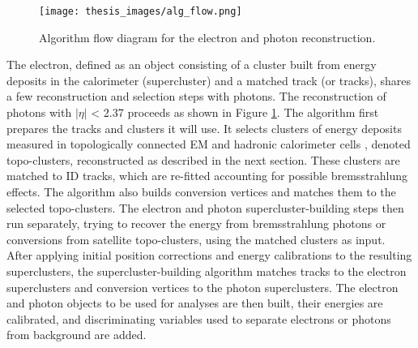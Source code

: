 \documentclass[a4paper, oneside, 11pt, openright]{book}
\begin{document}
		\begin{figure}
			\centering
			\texttt{[image: thesis\_images/alg\_flow.png]} 
			\caption{Algorithm flow diagram for the electron and photon reconstruction.}
			\label{fig:alg ph}
		\end{figure}
		
		The electron, defined as an object consisting of a cluster built from energy deposits in the calorimeter (supercluster) and a matched track (or tracks), shares a few reconstruction and selection steps with photons. The reconstruction of photons with $|\eta|$ < 2.37 proceeds as shown in Figure \ref{fig:alg ph}. The algorithm first prepares the tracks and clusters it will use. It selects clusters of energy deposits measured in topologically connected EM and hadronic calorimeter cells \cite{topo_cluster}, denoted topo-clusters, reconstructed as described in the next section. These clusters are matched to ID tracks, which are re-fitted accounting for possible bremsstrahlung effects. The algorithm also builds conversion vertices and matches them to the selected topo-clusters. The electron and photon supercluster-building steps then run separately, trying to recover the energy from bremsstrahlung photons or conversions from satellite topo-clusters, using the matched clusters as input. After applying initial position corrections and energy calibrations to the resulting superclusters, the supercluster-building algorithm matches tracks to the electron superclusters and conversion vertices to the photon superclusters. The electron and photon objects to be used for analyses are then built, their energies are calibrated, and discriminating variables used to separate electrons or photons from background are added.
		
\end{document}
